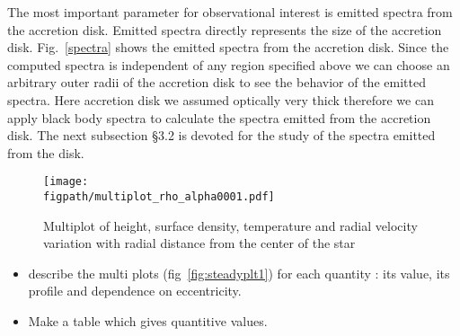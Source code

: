 \documentclass[useAMS,usenatbib]{mn2e}
\newcommand{\figpath}{./Figs/}
\begin{document}
The most important parameter for observational interest is emitted spectra from the accretion disk. Emitted spectra directly represents the size of the accretion disk. Fig.~\ref{spectra} shows the emitted spectra from the accretion disk. Since the computed spectra is independent of any region specified above we can choose an arbitrary outer radii of the accretion disk to see the behavior of the emitted spectra. Here accretion disk we assumed optically very thick therefore we can apply black body spectra to calculate the spectra emitted from the accretion disk. The next subsection \S3.2 is devoted for the study of the spectra emitted from the disk.
\begin{figure}
\centering
\texttt{[image: \\figpath/multiplot\_rho\_alpha0001.pdf]}
\caption{Multiplot of height, surface density, temperature and radial velocity variation with radial distance from the center of the star }
\label{steadyplt1}
\end{figure}

\begin{itemize}
\item describe the multi plots (fig~\ref{fig:steadyplt1}) for each quantity : its value, its
  profile and dependence on eccentricity.
\item Make a table which gives quantitive values.  
\end{itemize}
\end{document}
